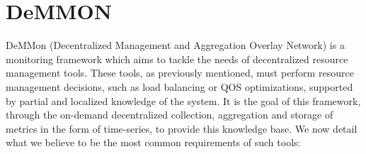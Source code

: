 

\chapter{DeMMON}
\label{cha:demmon} 

DeMMon (Decentralized Management and Aggregation Overlay Network) is a monitoring framework which aims to tackle the needs of decentralized resource management tools. These tools, as previously mentioned, must perform resource management decisions, such as load balancing or QOS optimizations, supported by partial and localized knowledge of the system. It is the goal of this framework, through the on-demand decentralized collection, aggregation and storage of metrics in the form of time-series, to provide this knowledge base. We now detail what we believe to be the most common requirements of such tools:


